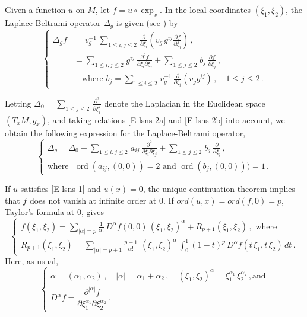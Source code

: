 \documentclass[12pt,a4paper]{amsart}
\theoremstyle{plain} %
\theoremstyle{definition}
\numberwithin{equation}{section}
\numberwithin{figure}{section}
\numberwithin{table}{section}
\DeclareMathOperator{\ord}{ord}
\begin{document}
Given a function $u$ on $M$, let $f = u\circ \exp_x$. In the local coordinates $(\xi_1,\xi_2)$, the Laplace-Beltrami operator $\Delta_g$ is given (see \cite[\S G.{III}, p.~126]{BeGM1971}) by
%
\begin{equation}\label{E-lsns-2c}
\left\{
\begin{array}{ll}
\Delta_g f & = v_g^{-1}\, \sum_{1 \le i,j \le 2\,} \frac{\partial}{\partial \xi_i}\left( v_g\, g^{ij} \frac{\partial f}{\partial \xi_j}\right)\,,\\[5pt]
& = \sum_{1 \le i,j \le 2\,} g^{ij}\, \frac{\partial^2 f}{\partial \xi_i \partial \xi_j} + \sum_{1 \le j \le 2\,}  b_j \, \frac{\partial f}{\partial \xi_j}\,,\\[5pt]
& \text{~~~where~}b_ j = \sum_{1 \le i \le 2\,} v_g^{-1}\, \frac{\partial}{\partial \xi_i} (v_g g^{ij})\,, \quad 1 \le j \le 2\,.
\end{array}%
\right.
\end{equation}

Letting $\Delta_0 = \sum_{1 \le j \le 2\,} \frac{\partial^2}{\partial \xi_j^2}$ denote the Laplacian in the Euclidean space $(T_xM,g_x)$, and taking relations \eqref{E-lsns-2a} and \eqref{E-lsns-2b} into account, we obtain the following expression for the Laplace-Beltrami operator,
%
\begin{equation}\label{E-lsns-2d}
\left\{
\begin{array}{l}
\Delta_g = \Delta_0 + \sum_{1 \le i,j \le 2\,} a_{ij}\, \frac{\partial^2}{\partial \xi_i \partial \xi_j} + \sum_{1 \le j \le 2\,} b_{j}\, \frac{\partial}{\partial \xi_j}\,,\\[5pt]
\text{where~~} \ord\left( a_{ij},(0,0) \right) = 2 \text{~and~} \ord\left( b_j,(0,0) \right))=1\,.
\end{array}
\right.
\end{equation}

If $u$ satisfies \eqref{E-lsns-1} and $u(x) = 0$, the unique continuation theorem \cite{Aron1957,DoFe1990a} implies that $f$ does not vanish at infinite order at $0$.  If $ord(u,x)= ord(f,0)=p$, Taylor's formula at $0$, gives
%
\begin{equation}\label{E-lsns-4}
\left\{
\begin{array}{l}
f(\xi_1,\xi_2) = \sum_{|\alpha| = p} \frac{1}{\alpha!}\, D^{\alpha}\!f(0,0)\,(\xi_1,\xi_2)^{\alpha} + R_{p+1}(\xi_1,\xi_2)\,, \text{~where}\\[8pt]
R_{p+1}(\xi_1,\xi_2) = \sum_{|\alpha| = p+1} \frac{p+1}{\alpha!}\, \,(\xi_1,\xi_2)^{\alpha} \, {\displaystyle \int_0^1 (1-t)^p\, D^{\alpha}\!f(t\,\xi_1,t\,\xi_2)\,dt}\,.
\end{array}%
\right.
\end{equation}
%
Here,  as usual,
%
\begin{equation}\label{E-lsns-4a}
\left\{
\begin{array}{l}
\alpha = (\alpha_1,\alpha_2)\,, \quad|\alpha| = \alpha_1 + \alpha_2\,, \quad (\xi_1,\xi_2)^{\alpha} = \xi_1^{\alpha_1}\, \xi_2^{\alpha_2}\,, \text{and}\\[5pt]
D^{\alpha}\!f = \dfrac{\partial^{|\alpha|}\!f}{\partial \xi_1^{\alpha_1}\partial \xi_2^{\alpha_2}}\,.
\end{array}%
\right.
\end{equation}
\end{document}
